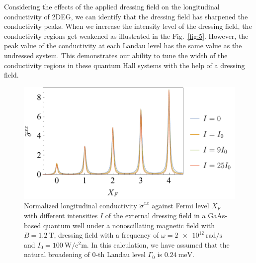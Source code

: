 \documentclass[
 reprint,
 amsmath,amssymb,
 aps,
 prb,
]{revtex4-2}
\begin{document}
{\color{Red}Considering the effects of the applied dressing field on the longitudinal conductivity of 2DEG, we can identify that the dressing field has sharpened the conductivity peaks.}
When we increase the intensity level of the dressing field, the conductivity regions get weakened as illustrated in the Fig.~\ref{fig:5}.
However, the peak value of the conductivity at each Landau level has the same value as the undressed system. This demonstrates our ability to tune the width of the conductivity regions in these quantum Hall systems with the help of a dressing field.

\begin{figure}[t]
\includegraphics[scale=0.54]{fig_4_conductivity_with_fermi_level}
\caption{ Normalized longitudinal conductivity $\widetilde{\sigma}^{xx}$ against Fermi level $X_F$ with different intensities $I$ of the external dressing field in a GaAs-based quantum well under a nonoscillating magnetic field with $B = \SI{1.2}{\tesla}$, dressing field with a  frequency of $\omega =\SI{2e12}{\radian\per\second}$ and $I_0 =\SI{100}{\watt\per\square\centi\metre}$. In this calculation, we have assumed that the natural  broadening of $0$-th Landau level $\Gamma_0$ is $\SI{0.24}{\milli\eV}$.}
\label{fig:4}
\end{figure}
\end{document}
